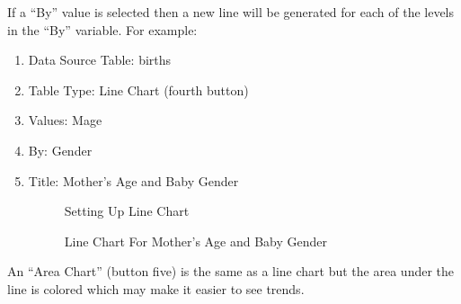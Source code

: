 If a ``By'' value is selected then a new line will be generated for each of the levels in the ``By'' variable. For example:

\begin{enumerate}
  \item Data Source Table: births
  \item Table Type: Line Chart (fourth button)
  \item Values: Mage
  \item By: Gender
  \item Title: Mother's Age and Baby Gender
  
  \begin{figure}[H]
    \begin{center}
      \caption{Setting Up Line Chart}
    \end{center}
  \end{figure}
  
  \begin{figure}[H]
    \begin{center}
      \caption{Line Chart For Mother's Age and Baby Gender}
    \end{center}
  \end{figure}
\end{enumerate}

An ``Area Chart'' (button five) is the same as a line chart but the area under the line is colored which may make it easier to see trends. 

